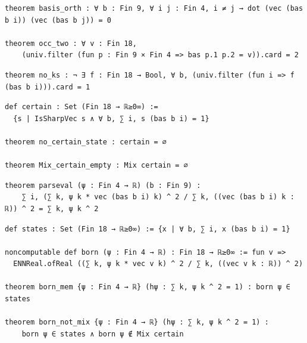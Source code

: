 \label{lean:basis-orth}
\begin{lstlisting}
theorem basis_orth : ∀ b : Fin 9, ∀ i j : Fin 4, i ≠ j → dot (vec (bas b i)) (vec (bas b j)) = 0

theorem occ_two : ∀ v : Fin 18,
    (univ.filter (fun p : Fin 9 × Fin 4 => bas p.1 p.2 = v)).card = 2
\end{lstlisting}

\label{lean:no-ks}
\begin{lstlisting}
theorem no_ks : ¬ ∃ f : Fin 18 → Bool, ∀ b, (univ.filter (fun i => f (bas b i))).card = 1
\end{lstlisting}

\label{lean:no-certain-state}
\begin{lstlisting}
def certain : Set (Fin 18 → ℝ≥0∞) :=
  {s | IsSharpVec s ∧ ∀ b, ∑ i, s (bas b i) = 1}

theorem no_certain_state : certain = ∅

theorem Mix_certain_empty : Mix certain = ∅
\end{lstlisting}

\label{lean:parseval}
\begin{lstlisting}
theorem parseval (ψ : Fin 4 → ℝ) (b : Fin 9) :
    ∑ i, (∑ k, ψ k * vec (bas b i) k) ^ 2 / ∑ k, ((vec (bas b i) k : ℝ)) ^ 2 = ∑ k, ψ k ^ 2
\end{lstlisting}

\label{lean:born-not-mix}
\begin{lstlisting}
def states : Set (Fin 18 → ℝ≥0∞) := {x | ∀ b, ∑ i, x (bas b i) = 1}

noncomputable def born (ψ : Fin 4 → ℝ) : Fin 18 → ℝ≥0∞ := fun v =>
  ENNReal.ofReal ((∑ k, ψ k * vec v k) ^ 2 / ∑ k, ((vec v k : ℝ)) ^ 2)

theorem born_mem {ψ : Fin 4 → ℝ} (hψ : ∑ k, ψ k ^ 2 = 1) : born ψ ∈ states

theorem born_not_mix {ψ : Fin 4 → ℝ} (hψ : ∑ k, ψ k ^ 2 = 1) :
    born ψ ∈ states ∧ born ψ ∉ Mix certain
\end{lstlisting}

